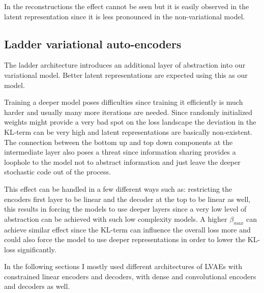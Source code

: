 \documentclass[12pt, english]{article}
\begin{document}
\vspace{4mm}

\par In the reconstructions the effect cannot be seen but it is easily observed in the latent representation since it is less pronounced in the non-variational model.

\newpage

\subsection{Ladder variational auto-encoders}

\vspace{5mm}

\par The ladder architecture introduces an additional layer of abstraction into our variational model. Better latent representations are expected using this as our model.

\vspace{4mm}

\par Training a deeper model poses difficulties since training it efficiently is much harder and usually many more iterations are needed. Since randomly initialized weights might provide a very bad spot on the loss landscape the deviation in the KL-term can be very high and latent representations are basically non-existent. The connection between the bottom up and top down components at the intermediate layer also poses a threat since information sharing provides a loophole to the model not to abstract information and just leave the deeper stochastic code out of the process. 

\vspace{4mm}

\par This effect can be handled in a few different ways such as: restricting the encoders first layer to be linear and the decoder at the top to be linear as well, this results in forcing the models to use deeper layers since a very low level of abstraction can be achieved with such low complexity models. A higher $\beta_{max}$ can achieve similar effect since the KL-term can influence the overall loss more and could also force the model to use deeper representations in order to lower the KL-loss significantly. 

\vspace{4mm}

\par In the following sections I mostly used different architectures of LVAEs with constrained linear encoders and decoders, with dense and convolutional encoders and decoders as well.
\end{document}
